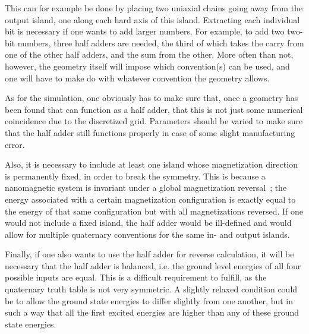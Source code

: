 \documentclass[11pt,a4paper,english]{article}
\begin{document}
This can for example be done by placing two uniaxial chains going away from the output island, one along each hard axis of this island. Extracting each individual bit is necessary if one wants to add larger numbers. For example, to add two two-bit numbers, three half adders are needed, the third of which takes the carry from one of the other half adders, and the sum from the other. More often than not, however, the geometry itself will impose which convention(s) can be used, and one will have to make do with whatever convention the geometry allows. \par %
As for the simulation, one obviously has to make sure that, once a geometry has been found that can function as a half adder, that this is not just some numerical coincidence due to the discretized grid. Parameters should be varied to make sure that the half adder still functions properly in case of some slight manufacturing error. \par
Also, it is necessary to include at least one island whose magnetization direction is permanently fixed, in order to break the symmetry. This is because a nanomagnetic system is invariant under a global magnetization reversal~\cite{GYP-18}; the energy associated with a certain magnetization configuration is exactly equal to the energy of that same configuration but with all magnetizations reversed. If one would not include a fixed island, the half adder would be ill-defined and would allow for multiple quaternary conventions for the same in- and output islands. \par
Finally, if one also wants to use the half adder for reverse calculation, it will be necessary that the half adder is balanced, i.e. the ground level energies of all four possible inputs are equal. This is a difficult requirement to fulfill, as the quaternary truth table is not very symmetric. A slightly relaxed condition could be to allow the ground state energies to differ slightly from one another, but in such a way that all the first excited energies are higher than any of these ground state energies. \par
\end{document}
